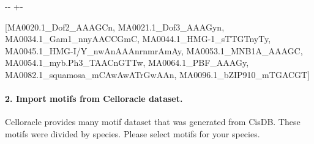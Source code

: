 \documentclass[letterpaper,10pt,english]{sphinxmanual}
\newlength\nbsphinxcodecellspacing
\begin{document}
{
\begin{sphinxVerbatim}[commandchars=\\\{\}]
\llap{\color{nbsphinxin}[30]:\,\hspace{\fboxrule}\hspace{\fboxsep}}
   

   
  

\PYG{p}{[}\PYG{p}{]}
\end{sphinxVerbatim}
}

{

\kern-\sphinxverbatimsmallskipamount\kern-\baselineskip
\kern+\FrameHeightAdjust\kern-\fboxrule
\vspace{\nbsphinxcodecellspacing}

\begin{sphinxVerbatim}[commandchars=\\\{\}]
\llap{\color{nbsphinxout}[30]:\,\hspace{\fboxrule}\hspace{\fboxsep}}[MA0020.1\_Dof2\_AAAGCn,
 MA0021.1\_Dof3\_AAAGyn,
 MA0034.1\_Gam1\_nnyAACCGmC,
 MA0044.1\_HMG-1\_sTTGTnyTy,
 MA0045.1\_HMG-I/Y\_nwAnAAAnrnmrAmAy,
 MA0053.1\_MNB1A\_AAAGC,
 MA0054.1\_myb.Ph3\_TAACnGTTw,
 MA0064.1\_PBF\_AAAGy,
 MA0082.1\_squamosa\_mCAwAwATrGwAAn,
 MA0096.1\_bZIP910\_mTGACGT]
\end{sphinxVerbatim}
}


\paragraph{2. Import motifs from Celloracle dataset.}
\label{\detokenize{notebooks/02_motif_scan/motif_data_preparation/01_How_to_load_motif_data:2.-Import-motifs-from-Celloracle-dataset.}}
Celloracle provides many motif dataset that was generated from CisDB. These motifs were divided by species. Please select motifs for your species.
\end{document}
